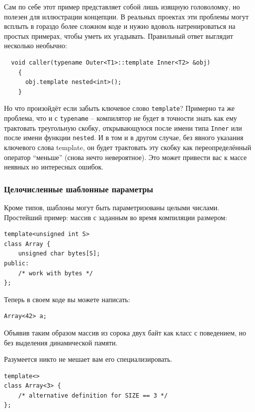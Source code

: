 \documentclass[a4paper,12pt,oneside]{article}
\begin{document}
Сам по себе этот пример представляет собой лишь изящную головоломку, но полезен для иллюстрации концепции. В реальных проектах эти проблемы могут всплыть в гораздо более сложном коде и нужно вдоволь натренироваться на простых примерах, чтобы уметь их угадывать. Правильный ответ выглядит несколько необычно:

\begin{lstlisting}
  void caller(typename Outer<T1>::template Inner<T2> &obj) 
    { 
      obj.template nested<int>();
    }
\end{lstlisting}

Но что произойдёт если забыть ключевое слово \lstinline!template!? Примерно та же проблема, что и с \lstinline!typename! -- компилятор не будет в точности знать как ему трактовать треугольную скобку, открывающуюся после имени типа \lstinline!Inner! или после имени функции \lstinline!nested!. И в том и в другом случае, без явного указания ключевого слова template, он будет трактовать эту скобку как переопределённый оператор ``меньше'' (снова нечто невероятное). Это может привести вас к массе неявных но интересных ошибок.

\subsubsection{Целочисленные шаблонные параметры}\label{IntegerTParam}

Кроме типов, шаблоны могут быть параметризованы целыми числами. Простейший пример: массив с заданным во время компиляции размером:

\begin{lstlisting}
template<unsigned int S>
class Array {
    unsigned char bytes[S];
public:
    /* work with bytes */
};
\end{lstlisting}

Теперь в своем коде вы можете написать:

\begin{lstlisting}
Array<42> a;
\end{lstlisting}

Объявив таким образом массив из сорока двух байт как класс с поведением, но без выделения динамической памяти.

Разумеется никто не мешает вам его специализировать.

\begin{lstlisting}
template<>
class Array<3> {
    /* alternative definition for SIZE == 3 */
};
\end{lstlisting}
\end{document}
